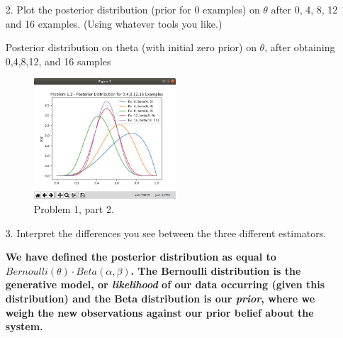 \documentclass[submit]{harvardml}
\newenvironment{answer}{%
    \color{answergreen}\bf}
  {%
  }
\begin{document}
\begin{enumerate}
\begin{answer}
    \end{answer}
%
\item[2.] Plot the posterior distribution (prior for 0 examples) on $\theta$ after 0, 4, 8, 12 and 16
examples. (Using whatever tools you like.)
%
    \begin{answer}

Posterior distribution on theta (with initial zero prior) on $\theta$, after obtaining 0,4,8,12, and 16 samples

    \begin{figure}[H] \centering
        \includegraphics[width=0.5\textwidth]{Problem1-2.png}
            \caption{Problem 1, part 2.}
        \label{fig:theta_obs} %
    \end{figure}
    \end{answer}


\item[3.] Interpret the differences you see between the three different estimators.

\begin{answer} 
    We have defined the posterior distribution as equal to $Bernoulli(\theta)
    \cdot Beta(\alpha, \beta)$.  The Bernoulli distribution is the generative
    model, or \textit{likelihood} of our data occurring (given this distribution) and the
    Beta distribution is our \textit{prior}, where we weigh the new observations 
    against our prior belief about the system.


\end{answer}
\end{enumerate}
\end{document}
